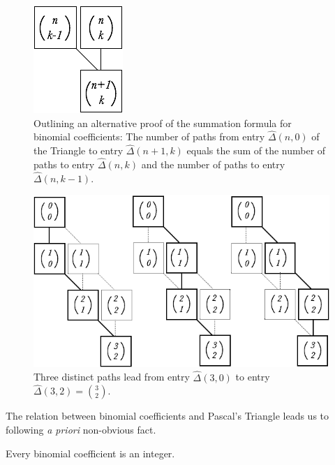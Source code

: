 \begin{figure}[htb]
\begin{center}
       \includegraphics[scale=0.4]{FiguresMaths/CoeffBinomiaux2}
\caption{Outlining an alternative proof of the summation formula for binomial coefficients:  The number of paths from entry $\hat{\Delta}(n, 0)$ of the Triangle to entry $\hat{\Delta}(n+1, k)$  equals the sum of the number of paths to entry $\hat{\Delta}(n, k)$ and the number of paths to entry $\hat{\Delta}(n, k-1)$.}
\label{fig:binomialCoeff2}
\end{center}
\end{figure}

\begin{figure}[htb]
\begin{center}
       \includegraphics[scale=0.4]{FiguresMaths/CoeffBinomiauxCounting}
\caption{Three distinct paths lead from entry $\hat{\Delta}(3,0)$ to entry $\hat{\Delta}(3,2) = {\displaystyle {3 \choose 2}}$.}
\label{fig:binomialCoeff3}
\end{center}
\end{figure}

\bigskip

The relation between binomial coefficients and Pascal's Triangle leads us to following {\it a priori} non-obvious fact.

\begin{prop}
\label{thm:binomcoeff-integer}
Every binomial coefficient is an integer.
\end{prop}

